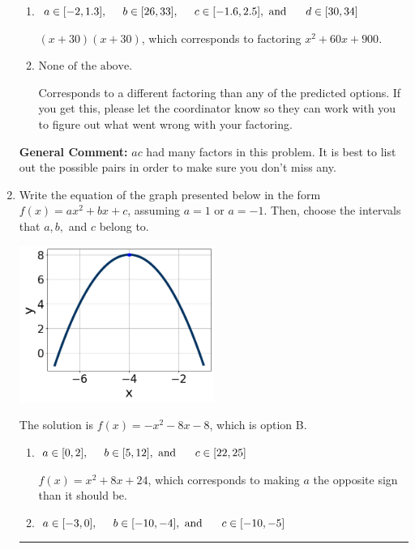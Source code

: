 \documentclass{extbook}[14pt]
\newcommand{\litem}[1]{\item #1

\rule{\textwidth}{0.4pt}}
\begin{document}
\begin{enumerate}
{\begin{enumerate}[label=\Alph*.]
 $(12x + 5)(3x + 5)$, which corresponds to associating some factor of a to c.
\item \( a \in [-2, 1.3], \hspace*{5mm} b \in [26, 33], \hspace*{5mm} c \in [-1.6, 2.5], \text{ and } \hspace*{5mm} d \in [30, 34] \)

 $(x + 30)(x + 30)$, which corresponds to factoring $x^{2} +60 x + 900$.
\item \( \text{None of the above.} \)

 Corresponds to a different factoring than any of the predicted options. If you get this, please let the coordinator know so they can work with you to figure out what went wrong with your factoring.
\end{enumerate}

\textbf{General Comment:} $ac$ had many factors in this problem. It is best to list out the possible pairs in order to make sure you don't miss any.
}
\litem{
Write the equation of the graph presented below in the form $f(x)=ax^2+bx+c$, assuming  $a=1$ or $a=-1$. Then, choose the intervals that $a, b,$ and $c$ belong to.

\begin{center}
    \includegraphics[width=0.5\textwidth]{../Figures/quadraticGraphToEquationCopyC.png}
\end{center}




The solution is \( f(x) = -x^{2} -8 x -8 \), which is option B.\begin{enumerate}[label=\Alph*.]
\item \( a \in [0, 2], \hspace*{5mm} b \in [5, 12], \text{ and } \hspace*{5mm} c \in [22, 25] \)

$f(x)=x^{2} +8 x + 24$, which corresponds to making $a$ the opposite sign than it should be.
\item \( a \in [-3, 0], \hspace*{5mm} b \in [-10, -4], \text{ and } \hspace*{5mm} c \in [-10, -5] \)


\end{enumerate}}
\end{enumerate}
\end{document}
